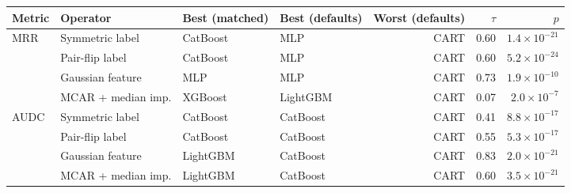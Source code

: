 \documentclass[pdflatex,sn-mathphys]{sn-jnl}
\theoremstyle{thmstyleone}
\begin{document}
\begin{table}[t]
\vspace{6pt}
\begin{tabular}{@{}llllrrr@{}}
\toprule
Metric & Operator & Best (matched) & Best (defaults) & Worst (defaults) & $\tau$ & $p$ \\
\midrule
MRR & Symmetric label & CatBoost & MLP & CART & 0.60 & $1.4\times10^{-21}$ \\
 & Pair-flip label & CatBoost & MLP & CART & 0.60 & $5.2\times10^{-24}$ \\
 & Gaussian feature & MLP & MLP & CART & 0.73 & $1.9\times10^{-10}$ \\
 & MCAR + median imp. & XGBoost & LightGBM & CART & 0.07 & $2.0\times10^{-7}$ \\
\midrule
AUDC & Symmetric label & CatBoost & CatBoost & CART & 0.41 & $8.8\times10^{-17}$ \\
 & Pair-flip label & CatBoost & CatBoost & CART & 0.55 & $5.3\times10^{-17}$ \\
 & Gaussian feature & LightGBM & CatBoost & CART & 0.83 & $2.0\times10^{-21}$ \\
 & MCAR + median imp. & LightGBM & CatBoost & CART & 0.60 & $3.5\times10^{-21}$ \\
\bottomrule
\end{tabular}
\end{table}
\end{document}
